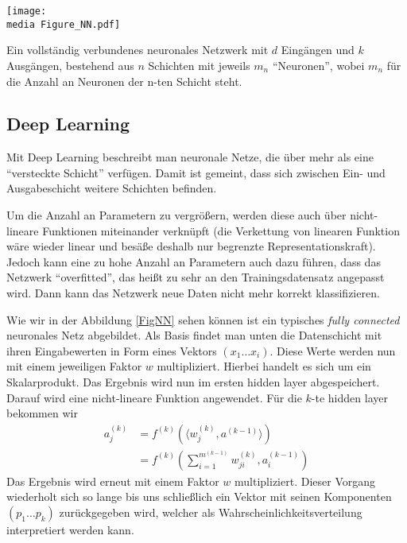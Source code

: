 \begin{dsafigure}
	\begin{center}
		\texttt{[image: \\media Figure\_NN.pdf]}
		\caption{Ein vollständig verbundenes neuronales Netzwerk mit $d$ Eingängen und $k$ Ausgängen, bestehend aus $n$ Schichten mit jeweils $m_n$ \enquote{Neuronen}, wobei $m_n$ für die Anzahl an Neuronen der n-ten Schicht steht.}

		\label{FigNN}
	\end{center}
\end{dsafigure}

\subsection{Deep Learning}

Mit Deep Learning beschreibt man neuronale Netze, die über mehr als eine \enquote{versteckte Schicht} verfügen. Damit ist gemeint, dass sich zwischen Ein- und Ausgabeschicht weitere Schichten befinden. 

Um die Anzahl an Parametern zu vergrößern, werden diese auch über nicht-lineare Funktionen miteinander verknüpft (die Verkettung von linearen Funktion wäre wieder linear und besäße deshalb nur begrenzte Representationskraft). Jedoch kann eine zu hohe Anzahl an Parametern auch dazu führen, dass das Netzwerk \enquote{overfitted}, das heißt zu sehr an den Trainingsdatensatz angepasst wird. Dann kann das Netzwerk neue Daten nicht mehr korrekt klassifizieren.

Wie wir in der Abbildung \ref{FigNN} sehen können ist ein typisches \emph{fully connected} neuronales Netz abgebildet. Als Basis findet man unten die Datenschicht mit ihren Eingabewerten in Form eines Vektors $(x_1 \dots x_i)$. Diese Werte werden nun mit einem jeweiligen Faktor $w$ multipliziert. Hierbei handelt es sich um ein Skalarprodukt. Das Ergebnis wird nun im ersten hidden layer abgespeichert. Darauf wird eine nicht-lineare Funktion angewendet. Für die $k$-te hidden layer bekommen wir
\begin{align*}
a_j^{(k)} &= f^{(k)} (\langle w_{j}^{(k)}, a^{(k-1)}\rangle)\\ &= f^{(k)} \left(\sum_{i=1}^{m^{(k-1)}} w_{ji}^{(k)},a_i^{(k-1)}\right)
\end{align*}
Das Ergebnis wird erneut mit einem Faktor $w$ multipliziert. Dieser Vorgang wiederholt sich so lange bis uns schließlich ein Vektor mit seinen Komponenten $(p_1 \dots p_k)$ zurückgegeben wird, welcher als Wahrscheinlichkeitsverteilung interpretiert werden kann.

